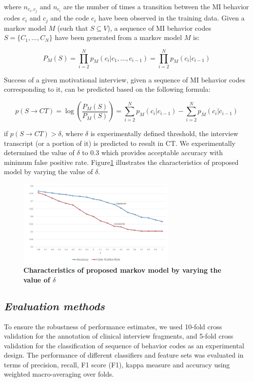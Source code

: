 \documentclass{amia}
\begin{document}
where $n_{c_i,c_j}$ and $n_{c_i}$ are the number of times a transition between the MI behavior codes $c_i$ and $c_j$ and the code $c_i$ have been observed in the training data. Given a markov model $M$ (such that $S\subseteq V$), a sequence of MI behavior codes $S = \{C_1,...,C_N\}$ have been generated from a markov model $M$ is:

\begin{equation}
P_M(S) = \prod_{i=2}^N p_M(c_i|c_1,\dots,c_{i-1})=\prod_{i=2}^N p_M(c_i|c_{i-1})
\end{equation}

Success of a given motivational interview, given a sequence of MI behavior codes corresponding to it, can be predicted based on the following formula:

\begin{equation}
p(S\rightarrow CT) = \log\left(\frac{P_M(S)}{P_{\overline M}(S)}\right)= \sum_{i=2}^N p_M(c_i|c_{i-1})-\sum_{i=2}^N p_{\overline M}(c_i|c_{i-1})
\end{equation}

if $p(S\rightarrow CT) > \delta $, where $\delta$ is experimentally defined threshold, the interview transcript (or a portion of it) is predicted to result in CT. We experimentally determined the value of $\delta$ to 0.3 which provides acceptable accuracy with minimum false positive rate. Figure\ref{fig:delta} illustrates the characteristics of proposed model by varying the value of $\delta$.  

\begin{figure}[htb!]
    \centering
    \includegraphics[width=0.70\textwidth]{figures/deltadata.png}
    \caption{\textbf{Characteristics of proposed markov model by varying the value of $\delta$}}
    \label{fig:delta}
\end{figure}

\subsection*{\textit{Evaluation methods}}
To ensure the robustness of performance estimates, we used 10-fold cross validation for the annotation of clinical interview fragments, and 5-fold cross validation for the classification of sequence of behavior codes \cite{} as an experimental design. The performance of different classifiers and feature sets was evaluated in terms of precision, recall, F1 score (F1), kappa measure and accuracy using weighted macro-averaging over folds.
\end{document}
